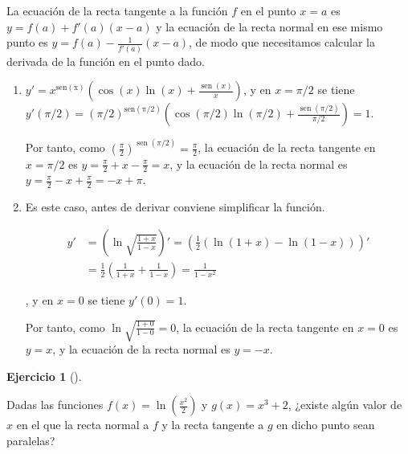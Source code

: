 \documentclass[
  spanish,
  a4paper,
]{scrreport}
\theoremstyle{definition}
\newtheorem{exercise}{Ejercicio}[chapter]
\theoremstyle{remark}
\begin{document}
\begin{tcolorbox}[enhanced jigsaw, arc=.35mm, bottomrule=.15mm, bottomtitle=1mm, breakable, colback=white, colbacktitle=quarto-callout-tip-color!10!white, colframe=quarto-callout-tip-color-frame, coltitle=black, left=2mm, leftrule=.75mm, opacityback=0, opacitybacktitle=0.6, rightrule=.15mm, title=\textcolor{quarto-callout-tip-color}{\faLightbulb}\hspace{0.5em}{Solución}, titlerule=0mm, toprule=.15mm, toptitle=1mm]

La ecuación de la recta tangente a la función \(f\) en el punto \(x=a\)
es \(y=f(a)+f'(a)(x-a)\) y la ecuación de la recta normal en ese mismo
punto es \(y=f(a)-\frac{1}{f'(a)}(x-a)\), de modo que necesitamos
calcular la derivada de la función en el punto dado.

\begin{enumerate}
\def\labelenumi{\alph{enumi}.}
\item
  \(y'= x^{\operatorname{sen(x)}}\left(\cos(x)\ln(x)+\frac{\operatorname{sen}(x)}{x}\right)\),
  y en \(x=\pi/2\) se tiene
  \(y'(\pi/2)= (\pi/2)^{\operatorname{sen(\pi/2)}}\left(\cos(\pi/2)\ln(\pi/2)+\frac{\operatorname{sen}(\pi/2)}{\pi/2}\right) = 1\).

  Por tanto, como
  \(\left(\frac{\pi}{2}\right)^{\operatorname{sen}(\pi/2)}=\frac{\pi}{2}\),
  la ecuación de la recta tangente en \(x=\pi/2\) es
  \(y=\frac{\pi}{2} + x-\frac{\pi}{2} = x\), y la ecuación de la recta
  normal es \(y=\frac{\pi}{2}-x+\frac{\pi}{2} = -x+\pi\).
\item
  Es este caso, antes de derivar conviene simplificar la función.

  \begin{align*}
   y'&=\left(\ln\sqrt{\frac{1+x}{1-x}}\right)' = \left(\frac{1}{2}(\ln(1+x)-\ln(1-x))\right)' \\ 
   &= \frac{1}{2}\left(\frac{1}{1+x}+\frac{1}{1-x}\right) = \frac{1}{1-x^2}
   \end{align*}

  , y en \(x=0\) se tiene \(y'(0)=1\).

  Por tanto, como \(\ln\sqrt{\frac{1+0}{1-0}}=0\), la ecuación de la
  recta tangente en \(x=0\) es \(y=x\), y la ecuación de la recta normal
  es \(y=-x\).
\end{enumerate}

\end{tcolorbox}

\begin{exercise}[]\protect\hypertarget{exr-tangente-normal-2}{}\label{exr-tangente-normal-2}

Dadas las funciones \(f(x)=\ln\left(\frac{x^2}{2}\right)\) y
\(g(x)=x^3+2\), ¿existe algún valor de \(x\) en el que la recta normal a
\(f\) y la recta tangente a \(g\) en dicho punto sean paralelas?

\end{exercise}
\end{document}
